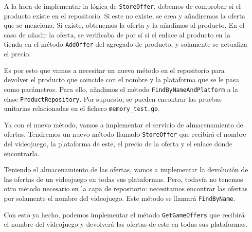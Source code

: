 A la hora de implementar la lógica de \verb|StoreOffer|, debemos de comprobar si el 
producto existe en el repositorio. Si este no existe, se crea y añadiremos la 
oferta que se menciona. Si existe, obtenemos la oferta y la añadimos al producto. 
En el caso de añadir la oferta, se verificaba de por sí si el enlace al producto en 
la tienda en el método \verb|AddOffer| del agregado de producto, y solamente se 
actualiza el precio.

Es por esto que vamos a necesitar un nuevo método en el repositorio para devolver 
el producto que coincide con el nombre y la plataforma que se le pasa como 
parámetros. Para ello, añadimos el método \verb|FindByNameAndPlatform| a la clase 
\verb|ProductRepository|. Por supuesto, se pueden encontrar las pruebas unitarias 
relacionadas en el fichero \verb|memory_test.go|.

Ya con el nuevo método, vamos a implementar el servicio de almacenamiento de 
ofertas. Tendremos un nuevo método llamado \verb|StoreOffer| que recibirá el nombre 
del videojuego, la plataforma de este, el precio de la oferta y el enlace donde 
encontrarla.

Teniendo el almacenamiento de las ofertas, vamos a implementar la devolución de las 
ofertas de un videojuego en todas sus plataformas. Pero, todavía no tenemos otro 
método necesario en la capa de repositorio: necesitamos encontrar las ofertas por 
solamente el nombre del videojuego. Este método se llamará \verb|FindByName|.

Con esto ya hecho, podemos implementar el método \verb|GetGameOffers| que recibirá 
el nombre del videojuego y devolverá las ofertas de este en todas sus plataformas.
